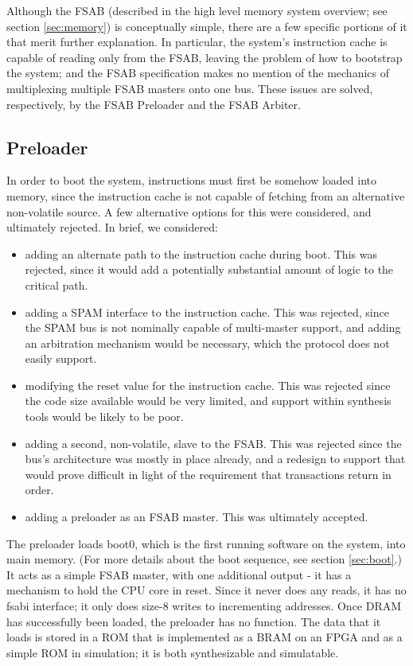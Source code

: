 \documentclass[10pt]{article}
\begin{document}
Although the FSAB (described in the high level memory system overview; see
section \ref{sec:memory}) is conceptually simple, there are a few specific
portions of it that merit further explanation.  In particular, the system's
instruction cache is capable of reading only from the FSAB, leaving the
problem of how to bootstrap the system; and the FSAB specification makes no
mention of the mechanics of multiplexing multiple FSAB masters onto one bus. 
These issues are solved, respectively, by the FSAB Preloader and the FSAB
Arbiter.

\subsection{Preloader}
\label{sec:preloader}

In order to boot the system, instructions must first be somehow loaded into
memory, since the instruction cache is not capable of fetching from an
alternative non-volatile source. A few alternative options for this were
considered, and ultimately rejected. In brief, we considered:

\begin{itemize}
\item{adding an alternate path to the instruction cache during boot. This
was rejected, since it would add a potentially substantial amount of logic
to the critical path.}
\item{adding a SPAM interface to the instruction cache. This was rejected,
since the SPAM bus is not nominally capable of multi-master support, and
adding an arbitration mechanism would be necessary, which the protocol does
not easily support.}
\item{modifying the reset value for the instruction cache. This was rejected
since the code size available would be very limited, and support within
synthesis tools would be likely to be poor.}
\item{adding a second, non-volatile, slave to the FSAB. This was rejected
since the bus's architecture was mostly in place already, and a redesign to
support that would prove difficult in light of the requirement that
transactions return in order.}
\item{adding a preloader as an FSAB master. This was ultimately accepted.}
\end{itemize}

The preloader loads boot0, which is the first running software on the
system, into main memory.  (For more details about the boot sequence, see
section \ref{sec:boot}.) It acts as a simple FSAB master, with one
additional output - it has a mechanism to hold the CPU core in reset.  Since
it never does any reads, it has no fsabi interface; it only does size-8
writes to incrementing addresses.  Once DRAM has successfully been loaded,
the preloader has no function.  The data that it loads is stored in a ROM
that is implemented as a BRAM on an FPGA and as a simple ROM in simulation;
it is both synthesizable and simulatable.
\end{document}
